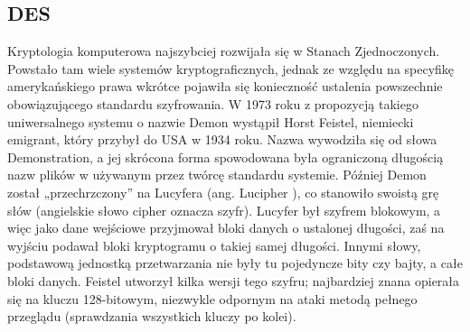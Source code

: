 \documentclass[a4paper, 10pt] {article}
\begin{document}
\subsection{DES}
Kryptologia komputerowa najszybciej rozwijała się w Stanach Zjednoczonych. Powstało tam wiele systemów kryptograficznych, jednak ze względu na specyfikę amerykańskiego prawa wkrótce pojawiła się konieczność ustalenia powszechnie obowiązującego standardu szyfrowania. W 1973 roku z propozycją takiego uniwersalnego systemu o nazwie Demon wystąpił Horst Feistel, niemiecki emigrant, który przybył do USA w 1934 roku. Nazwa wywodziła się od słowa Demonstration, a jej
skrócona forma spowodowana była ograniczoną długością nazw plików w używanym przez twórcę standardu systemie. Później Demon został „przechrzczony” na Lucyfera (ang. Lucipher ), co stanowiło swoistą grę słów (angielskie słowo cipher oznacza szyfr). Lucyfer był szyfrem blokowym, a
więc jako dane wejściowe przyjmował bloki danych o ustalonej długości, zaś na wyjściu podawał
bloki kryptogramu o takiej samej długości. Innymi słowy, podstawową jednostką przetwarzania
nie były tu pojedyncze bity czy bajty, a całe bloki danych. Feistel utworzył kilka wersji tego szyfru; najbardziej znana opierała się na kluczu 128-bitowym, niezwykle odpornym na ataki metodą
pełnego przeglądu (sprawdzania wszystkich kluczy po kolei).
\end{document}
